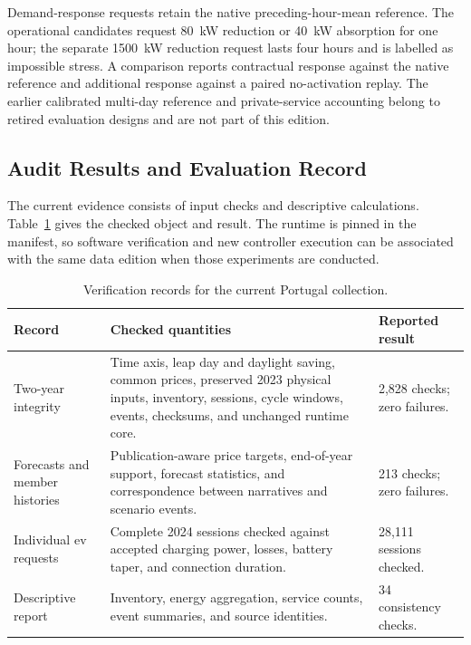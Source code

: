 Demand-response requests retain the native preceding-hour-mean reference. The operational candidates request 80~kW reduction or 40~kW absorption for one hour; the separate 1500~kW reduction request lasts four hours and is labelled as impossible stress. A comparison reports contractual response against the native reference and additional response against a paired no-activation replay. The earlier calibrated multi-day reference and private-service accounting belong to retired evaluation designs and are not part of this edition.

\subsection{Audit Results and Evaluation Record}

The current evidence consists of input checks and descriptive calculations. Table~\ref{tab:app-portugal-current-checks} gives the checked object and result. The runtime is pinned in the manifest, so software verification and new controller execution can be associated with the same data edition when those experiments are conducted.

\begin{table}[htbp]
\centering\small
\caption{Verification records for the current Portugal collection.}
\label{tab:app-portugal-current-checks}
\begin{tabularx}{\textwidth}{@{}p{}X p{}@{}}
\toprule
\textbf{Record} & \textbf{Checked quantities} & \textbf{Reported result}\\
\midrule
Two-year integrity & Time axis, leap day and daylight saving, common prices, preserved 2023 physical inputs, inventory, sessions, cycle windows, events, checksums, and unchanged runtime core. & 2,828 checks; zero failures.\\
Forecasts and member histories & Publication-aware price targets, end-of-year support, forecast statistics, and correspondence between narratives and scenario events. & 213 checks; zero failures.\\
Individual \gls{ev} requests & Complete 2024 sessions checked against accepted charging power, losses, battery taper, and connection duration. & 28,111 sessions checked.\\
Descriptive report & Inventory, energy aggregation, service counts, event summaries, and source identities. & 34 consistency checks.\\
\bottomrule
\end{tabularx}
\end{table}

